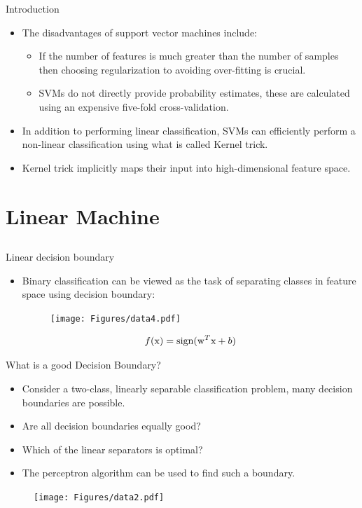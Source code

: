 \begin{frame}{Introduction}
\begin{itemize}
\item The disadvantages of support vector machines include:
\begin{itemize}
\item If the number of features is much greater than the number of samples then choosing regularization to avoiding over-fitting is crucial. 
\item SVMs do not directly provide probability estimates, these are calculated using an expensive five-fold cross-validation.
\end{itemize}
\item In addition to performing linear classification, SVMs can efficiently perform a non-linear classification using what is called {\color{mycolor1}Kernel trick}.
\item Kernel trick implicitly maps their input into high-dimensional feature space.
\end{itemize}
\end{frame}

\section{Linear Machine}
\subsection{}
\begin{frame}{Linear decision boundary}
\begin{itemize}
\item Binary classification can be viewed as the task of separating classes in feature space using decision boundary:
\begin{figure}
\texttt{[image: Figures/data4.pdf]}
\end{figure}
\[f({\rm x})=\text{sign}({\rm w}^T{\rm x}+b)\]
\end{itemize}
\end{frame}

\begin{frame}{What is a good Decision Boundary?}
\begin{itemize}
\item Consider a two-class, linearly
separable classification problem, many decision boundaries are possible.
\item Are all decision boundaries equally
good?
\item Which of the linear separators is optimal?
\item  The perceptron algorithm can be
used to find such a boundary.
\end{itemize}
\begin{figure}
\texttt{[image: Figures/data2.pdf]}
\end{figure}
\end{frame}

